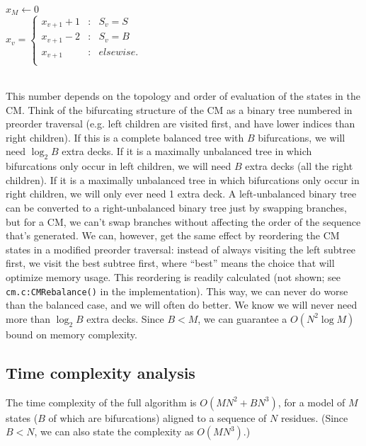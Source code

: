 \documentclass[11pt]{article}
\begin{document}
\begin{algorithm}
\begin{algtab*}
  $x_M \leftarrow 0$\\
     $x_v = \left\{ 
       \begin{array}{rcl} 
        x_{v+1} + 1 &:& S_v = S\\
        x_{v+1} - 2 &:& S_v = B\\
        x_{v+1}     &:& elsewise.\\
       \end{array} \right.$\\
  \\
\end{algtab*}
\end{algorithm}

This number depends on the topology and order of evaluation of the
states in the CM. Think of the bifurcating structure of the CM as a
binary tree numbered in preorder traversal (e.g. left children are
visited first, and have lower indices than right children). If this is
a complete balanced tree with $B$ bifurcations, we will need $\log_2
B$ extra decks. If it is a maximally unbalanced tree in which
bifurcations only occur in left children, we will need $B$ extra decks
(all the right children). If it is a maximally unbalanced tree in
which bifurcations only occur in right children, we will only ever
need 1 extra deck. A left-unbalanced binary tree can be converted to a
right-unbalanced binary tree just by swapping branches, but for a CM,
we can't swap branches without affecting the order of the sequence
that's generated. We can, however, get the same effect by reordering
the CM states in a modified preorder traversal: instead of always
visiting the left subtree first, we visit the best subtree first,
where ``best'' means the choice that will optimize memory usage.  This
reordering is readily calculated (not shown; see
\texttt{cm.c:CMRebalance()} in the implementation).  This way, we can
never do worse than the balanced case, and we will often do better. We
know we will never need more than $\log_2 B$ extra decks. Since $B <
M$, we can guarantee a $O(N^2 \log M)$ bound on memory complexity.

\subsection{Time complexity analysis}

The time complexity of the full algorithm is $O(MN^2 + BN^3)$, for a
model of $M$ states ($B$ of which are bifurcations) aligned to a
sequence of $N$ residues. (Since $B < N$, we can also state the
complexity as $O(MN^3)$.)
\end{document}
